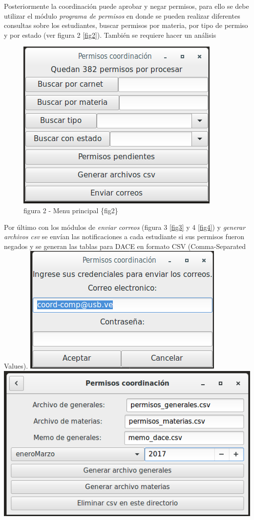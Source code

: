 \documentclass[]{article}
\begin{document}
Posteriormente la coordinación puede aprobar y negar permisos, para ello
se debe utilizar el módulo \emph{programa de permisos} en donde se
pueden realizar diferentes consultas sobre los estudiantes, buscar
permisos por materia, por tipo de permiso y por estado (ver figura 2
\ref{fig2}). También se requiere hacer un análisis

\begin{figure}[htbp]
\centering
\includegraphics{principal.png}
\caption{figura 2 - Menu principal \{fig2\}}
\end{figure}

Por último con los módulos de \emph{enviar correos} (figura 3 \ref{fig3}
y 4 \ref{fig4}) y \emph{generar archivos csv} se envían las
notificaciones a cada estudiante si sus permisos fueron negados y se
generan las tablas para DACE en formato CSV (Comma-Separated Values).
\includegraphics{correos.png} \includegraphics{csv.png}
\end{document}
